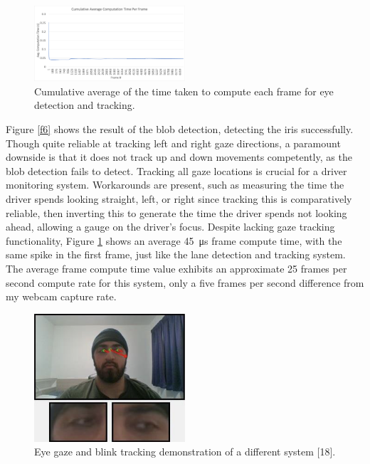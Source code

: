 \documentclass[9pt,conference]{IEEEtran}
\begin{document}
\begin{figure}[htbp]
    \centerline{\includegraphics[width=0.5\textwidth]{assets/Eye_Avg-FPT.png}}
    \caption{Cumulative average of the time taken to compute each frame for eye detection and tracking.}
    \label{f7}
\end{figure}

Figure \ref{f6} shows the result of the blob detection, detecting the iris successfully. Though quite reliable at tracking left and right gaze directions, a paramount downside is that it does not track up and down movements competently, as the blob detection fails to detect. Tracking all gaze locations is crucial for a driver monitoring system. Workarounds are present, such as measuring the time the driver spends looking straight, left, or right since tracking this is comparatively reliable, then inverting this to generate the time the driver spends not looking ahead, allowing a gauge on the driver's focus. Despite lacking gaze tracking functionality, Figure \ref{f7} shows an average \SI{45}{\micro\second} frame compute time, with the same spike in the first frame, just like the lane detection and tracking system. The average frame compute time value exhibits an approximate 25 frames per second compute rate for this system, only a five frames per second difference from my webcam capture rate.

\begin{figure}[htbp]
    \centerline{\includegraphics[width=0.5\textwidth]{assets/Gagan-eye.png}}
    \caption{Eye gaze and blink tracking demonstration of a different system [18].}
    \label{f8}
\end{figure}
\end{document}
